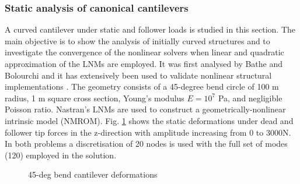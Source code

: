 \documentclass[11pt]{article}
\begin{document}
\subsubsection{Static analysis of canonical cantilevers}
A curved cantilever under static and follower loads is studied in this section. 
The main objective  is to show the analysis of initially curved structures and  to investigate the convergence of the nonlinear solvers when linear and quadratic approximation of the LNMs are employed.  It was first analysed  by Bathe and Bolourchi \cite{Bathe1979} and it has extensively been used to validate nonlinear structural implementations \cite{Simo1986a,Palacios2010,Werter2016}. The geometry consists of a 45-degree bend circle of 100 m radius, 1 m square cross section, Young's modulus $E = 10^7$ Pa, and negligible Poisson ratio. Nastran's LNMs are used to construct a geometrically-nonlinear intrinsic model (NMROM).  Fig. \ref{fig:simo_shapes} shows the static deformations under dead and follower tip forces in the z-direction with amplitude increasing from 0 to 3000N. In both problems a discretisation of 20 nodes is used with the full set of modes (120) employed in the solution. %
\begin{figure}[h!]
 \centering
\caption{45-deg bend cantilever deformations}\label{fig:simo_shapes}
\end{figure}
\end{document}
